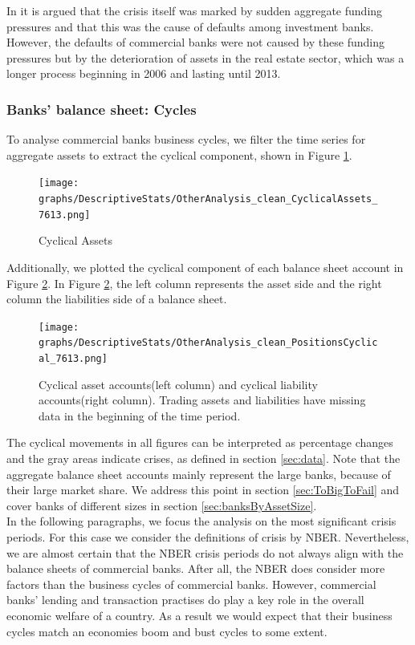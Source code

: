 \documentclass[12pt, a4paper]{article} %
\begin{document}
In \citet{antoniades2019commercial} it is argued that the crisis itself was marked by sudden aggregate funding pressures and that this was the cause of defaults among investment banks. However, the defaults of commercial banks were not caused by these funding pressures but by the deterioration of assets in the real estate sector, which was a longer process beginning in 2006 and lasting until 2013.
\fi




\subsubsection{Banks' balance sheet: Cycles}

To analyse commercial banks business cycles, we filter the time series for aggregate assets to extract the cyclical component, shown in Figure \ref{fig:cyclial_assets}. 

\begin{figure}[H]
\begin{minipage}{\textwidth}
\texttt{[image: graphs/DescriptiveStats/OtherAnalysis\_clean\_CyclicalAssets\_7613.png]}
\caption[1]{Cyclical Assets}
\label{fig:cyclial_assets}
\end{minipage}
\end{figure}

Additionally, we plotted the cyclical component of each balance sheet account in Figure \ref{fig:positions}. In Figure \ref{fig:positions}, the left column represents the asset side and the right column the liabilities side of a balance sheet. 


\begin{figure}[H]
\begin{minipage}{\textwidth}
\texttt{[image: graphs/DescriptiveStats/OtherAnalysis\_clean\_PositionsCyclical\_7613.png]}
\caption[1]{Cyclical asset accounts(left column) and cyclical liability accounts(right column). Trading assets and liabilities have missing data in the beginning of the time period.}
\label{fig:positions}
\end{minipage}
\end{figure}

The cyclical movements in all figures can be interpreted as percentage changes and the gray areas indicate crises, as defined in section \ref{sec:data}. Note that the aggregate balance sheet accounts mainly represent the large banks, because of their large market share. We address this point in section \ref{sec:ToBigToFail} and cover banks of different sizes in section \ref{sec:banksByAssetSize}.\\
In the following paragraphs, we focus the analysis on the most significant crisis periods. For this case we consider the definitions of crisis by NBER. Nevertheless, we are almost certain that the NBER crisis periods do not always align with the balance sheets of commercial banks. After all, the NBER does consider more factors than the business cycles of commercial banks. However, commercial banks' lending and transaction practises do play a key role in the overall economic welfare of a country. As a result we would expect that their business cycles match an economies boom and bust cycles to some extent.
\end{document}
